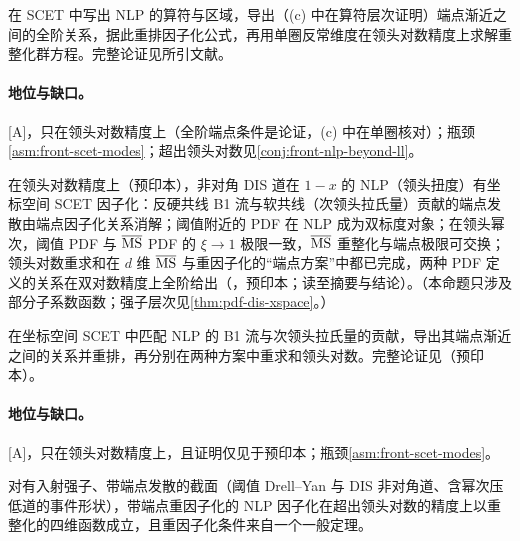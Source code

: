 \begin{proofsketch}
在 SCET 中写出 NLP 的算符与区域，导出（(c) 中在算符层次证明）端点渐近之间的全阶关系，据此重排因子化公式，再用单圈反常维度在领头对数精度上求解重整化群方程。完整论证见所引文献。
\end{proofsketch}

\paragraph{地位与缺口。}[A]，只在领头对数精度上（全阶端点条件是论证，(c) 中在单圈核对）；瓶颈\cref{asm:front-scet-modes}；超出领头对数见\cref{conj:front-nlp-beyond-ll}。

\begin{proposition}\label{prop:front-nlp-dis}
在领头对数精度上（预印本），非对角 DIS 道在 $1-x$ 的 NLP（领头扭度）有坐标空间 SCET 因子化：反硬共线 B1 流与软共线（次领头拉氏量）贡献的端点发散由端点因子化关系消解；阈值附近的 PDF 在 NLP 成为双标度对象；在领头幂次，阈值 PDF 与 $\overline{\mathrm{MS}}$ PDF 的 $\xi\to1$ 极限一致，$\overline{\mathrm{MS}}$ 重整化与端点极限可交换；领头对数重求和在 $d$ 维 $\overline{\mathrm{MS}}$ 与重因子化的“端点方案”中都已完成，两种 PDF 定义的关系在双对数精度上全阶给出（\cite{Beneke:2026miy}，预印本；读至摘要与结论）。（本命题只涉及部分子系数函数；强子层次见\cref{thm:pdf-dis-xspace}。）
\end{proposition}

\begin{proofsketch}
在坐标空间 SCET 中匹配 NLP 的 B1 流与次领头拉氏量的贡献，导出其端点渐近之间的关系并重排，再分别在两种方案中重求和领头对数。完整论证见\cite{Beneke:2026miy}（预印本）。
\end{proofsketch}

\paragraph{地位与缺口。}[A]，只在领头对数精度上，且证明仅见于预印本；瓶颈\cref{asm:front-scet-modes}。

\begin{conjecture}\label{conj:front-nlp-beyond-ll}
对有入射强子、带端点发散的截面（阈值 Drell--Yan 与 DIS 非对角道、含幂次压低道的事件形状），带端点重因子化的 NLP 因子化在超出领头对数的精度上以重整化的四维函数成立，且重因子化条件来自一个一般定理。
\end{conjecture}

